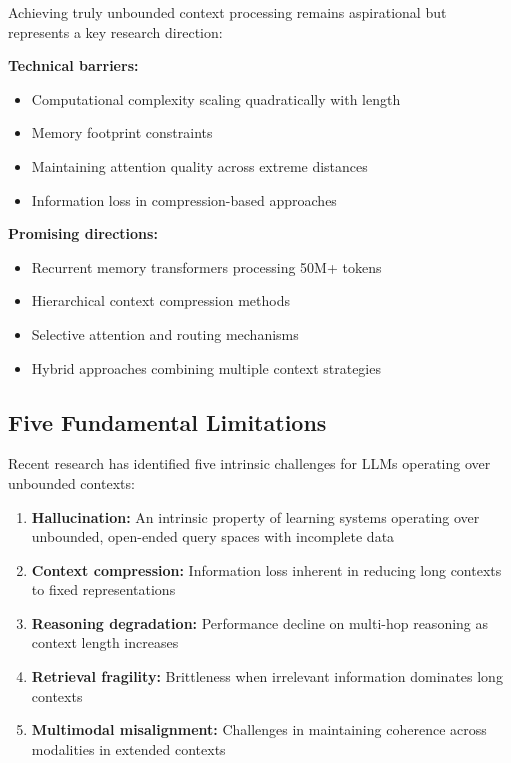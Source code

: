 \documentclass[11pt]{article}
\begin{document}
Achieving truly unbounded context processing remains aspirational but represents a key research direction:

\textbf{Technical barriers:}
\begin{itemize}[leftmargin=*]
    \item Computational complexity scaling quadratically with length
    \item Memory footprint constraints
    \item Maintaining attention quality across extreme distances
    \item Information loss in compression-based approaches
\end{itemize}

\textbf{Promising directions:}
\begin{itemize}[leftmargin=*]
    \item Recurrent memory transformers processing 50M+ tokens
    \item Hierarchical context compression methods
    \item Selective attention and routing mechanisms
    \item Hybrid approaches combining multiple context strategies
\end{itemize}

\subsection{Five Fundamental Limitations}

Recent research has identified five intrinsic challenges for LLMs operating over unbounded contexts:

\begin{enumerate}[leftmargin=*]
    \item \textbf{Hallucination:} An intrinsic property of learning systems operating over unbounded, open-ended query spaces with incomplete data
    \item \textbf{Context compression:} Information loss inherent in reducing long contexts to fixed representations
    \item \textbf{Reasoning degradation:} Performance decline on multi-hop reasoning as context length increases
    \item \textbf{Retrieval fragility:} Brittleness when irrelevant information dominates long contexts
    \item \textbf{Multimodal misalignment:} Challenges in maintaining coherence across modalities in extended contexts
\end{enumerate}
\end{document}
